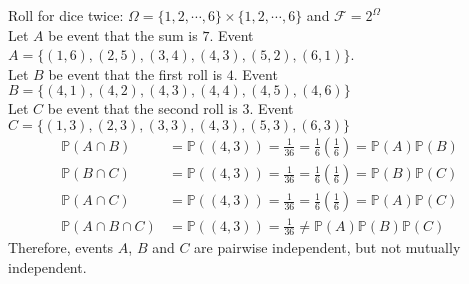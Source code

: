\documentclass{huhtakm-template-book}
\newcommand{\prob}{\mathbb{P}}
\begin{document}
\begin{eg}
	Roll for dice twice: $\Omega=\{1,2,\cdots,6\}\times\{1,2,\cdots,6\}$ and $\mathcal{F}=2^{\Omega}$\\
	Let $A$ be event that the sum is $7$. Event $A=\{(1,6),(2,5),(3,4),(4,3),(5,2),(6,1)\}$.\\
	Let $B$ be event that the first roll is $4$. Event $B=\{(4,1),(4,2),(4,3),(4,4),(4,5),(4,6)\}$\\
	Let $C$ be event that the second roll is $3$. Event $C=\{(1,3),(2,3),(3,3),(4,3),(5,3),(6,3)\}$
	\begin{align*}
		\prob(A\cap B)&=\prob((4,3))=\frac{1}{36}=\frac{1}{6}\left(\frac{1}{6}\right)=\prob(A)\prob(B)\\
		\prob(B\cap C)&=\prob((4,3))=\frac{1}{36}=\frac{1}{6}\left(\frac{1}{6}\right)=\prob(B)\prob(C)\\
		\prob(A\cap C)&=\prob((4,3))=\frac{1}{36}=\frac{1}{6}\left(\frac{1}{6}\right)=\prob(A)\prob(C)\\
		\prob(A\cap B\cap C)&=\prob((4,3))=\frac{1}{36}\neq\prob(A)\prob(B)\prob(C)
	\end{align*}
	Therefore, events $A$, $B$ and $C$ are pairwise independent, but not mutually independent.
\end{eg}

\newpage
\end{document}
